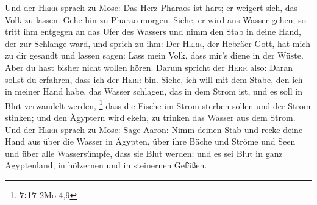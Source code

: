  Und der \textsc{Herr} sprach zu Mose: Das Herz Pharaos
ist hart; er weigert sich, das Volk zu lassen.  Gehe hin
zu Pharao morgen. Siehe, er wird ans Wasser gehen; so tritt ihm entgegen
an das Ufer des Wassers und nimm den Stab in deine Hand, der zur
Schlange ward,  und sprich zu ihm: Der \textsc{Herr}, der
Hebräer Gott, hat mich zu dir gesandt und lassen sagen: Lass mein Volk,
dass mir's diene in der Wüste. Aber du hast bisher nicht wollen hören.
 Darum spricht der \textsc{Herr} also: Daran sollst du
erfahren, dass ich der \textsc{Herr} bin. Siehe, ich will mit dem Stabe,
den ich in meiner Hand habe, das Wasser schlagen, das in dem Strom ist,
und es soll in Blut verwandelt werden, \footnote{\textbf{7:17} 2Mo 4,9}
 dass die Fische im Strom sterben sollen und der Strom
stinken; und den Ägyptern wird ekeln, zu trinken das Wasser aus dem
Strom.  Und der \textsc{Herr} sprach zu Mose: Sage Aaron:
Nimm deinen Stab und recke deine Hand aus über die Wasser in Ägypten,
über ihre Bäche und Ströme und Seen und über alle Wassersümpfe, dass sie
Blut werden; und es sei Blut in ganz Ägyptenland, in hölzernen und in
steinernen Gefäßen.

